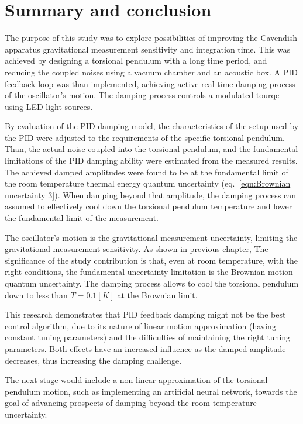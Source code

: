 \documentclass[\main/master.tex]{subfiles}
\begin{document}
\newspacing
\chapter{Summary and conclusion}\label{chapter:Summary and conclusion}
The purpose of this study was to explore possibilities of improving the Cavendish apparatus gravitational measurement sensitivity and integration time. This was achieved by designing a torsional pendulum with a long time period, and reducing the coupled noises using a vacuum chamber and an acoustic box. A PID feedback loop was than implemented, achieving active real-time damping process of the oscillator's motion. The damping process controls a modulated tourqe using LED light sources. 
\par\noindent
By evaluation of the PID damping model, the characteristics of the setup used by the PID were adjusted to the requirements of the specific torsional pendulum. Than, the actual noise coupled into the torsional pendulum, and the fundamental limitations of the PID damping ability were estimated from the measured results. The achieved damped amplitudes were found to be at the fundamental limit of the room temperature thermal energy quantum uncertainty (eq.~\ref{eqn:Brownian uncertainty 3}). When damping beyond that amplitude, the damping process can assumed to effectively cool down the torsional pendulum temperature and lower the fundamental limit of the measurement. 
\par\noindent
The oscillator's motion is the gravitational measurement uncertainty, limiting the gravitational measurement sensitivity. As shown in previous chapter, The significance of the study contribution is that, even at room temperature, with the right conditions, the fundamental uncertainty limitation is the Brownian motion quantum uncertainty. The damping process allows to cool the torsional pendulum down to less than $T=0.1[K]$ at the Brownian limit. 
\par\noindent
This research demonstrates that PID feedback damping might not be the best control algorithm, due to its nature of linear motion approximation (having constant tuning parameters) and the difficulties of maintaining the right tuning parameters. Both effects have an increased influence as the damped amplitude decreases, thus increasing the damping challenge.
\par\noindent
The next stage would include a non linear approximation of the torsional pendulum motion, such as implementing an artificial neural network, towards the goal of advancing prospects of damping beyond the room temperature uncertainty. 
\end{document}

